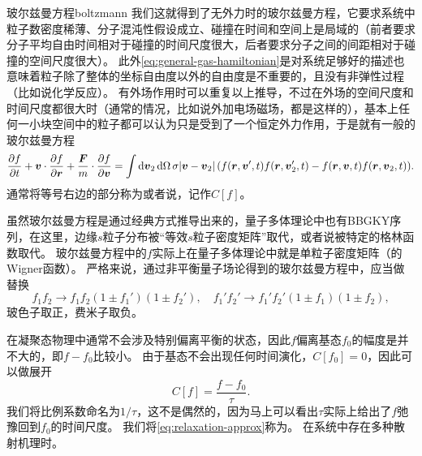 \begin{back}{玻尔兹曼方程}{boltzmann}
    我们这就得到了无外力时的玻尔兹曼方程，它要求系统中粒子数密度稀薄、分子混沌性假设成立、碰撞在时间和空间上是局域的（前者要求分子平均自由时间相对于碰撞的时间尺度很大，后者要求分子之间的间距相对于碰撞的空间尺度很大）。
    此外\eqref{eq:general-gas-hamiltonian}是对系统足够好的描述也意味着粒子除了整体的坐标自由度以外的自由度是不重要的，且没有非弹性过程（比如说化学反应）。
    有外场作用时可以重复以上推导，不过在外场的空间尺度和时间尺度都很大时（通常的情况，比如说外加电场磁场，都是这样的），基本上任何一小块空间中的粒子都可以认为只是受到了一个恒定外力作用，于是就有一般的玻尔兹曼方程
    \begin{equation}
        \pdv{f}{t} + \vb*{v} \cdot \pdv{f}{\vb*{r}} + \frac{\vb*{F}}{m} \cdot \pdv{f}{\vb*{v}} = \int \dd{\vb*{v}_2} \dd{\Omega} \sigma \abs*{\vb*{v}-\vb*{v}_2} (f(\vb*{r}, \vb*{v}', t) f(\vb*{r}, \vb*{v}'_{2}, t) - f(\vb*{r}, \vb*{v}, t) f(\vb*{r}, \vb*{v}_{2}, t)).
        \label{eq:boltzmann-eq-with-force}
    \end{equation}
    通常将等号右边的部分称为或者说，记作$C[f]$。

    虽然玻尔兹曼方程是通过经典方式推导出来的，量子多体理论中也有BBGKY序列，在这里，边缘$s$粒子分布被“等效$s$粒子密度矩阵”取代，或者说被特定的格林函数取代。
    玻尔兹曼方程中的$f$实际上在量子多体理论中就是单粒子密度矩阵（的Wigner函数）。
    严格来说，通过非平衡量子场论得到的玻尔兹曼方程中，应当做替换
    \begin{equation}
        f_1 f_2 \longrightarrow f_1 f_2 (1 \pm f_1') (1 \pm f_2'), \quad f_1' f_2' \longrightarrow f_1' f_2' (1 \pm f_1) (1 \pm f_2),
    \end{equation}
    玻色子取正，费米子取负。

    在凝聚态物理中通常不会涉及特别偏离平衡的状态，因此$f$偏离基态$f_0$的幅度是并不大的，即$f - f_0$比较小。
    由于基态不会出现任何时间演化，$C[f_0] = 0$，因此可以做展开
    \begin{equation}
        C[f] = \frac{f - f_0}{\tau}.
        \label{eq:relaxation-approx}
    \end{equation}
    我们将比例系数命名为$1 / \tau$，这不是偶然的，因为马上可以看出$\tau$实际上给出了$f$弛豫回到$f_0$的时间尺度。
    我们将\eqref{eq:relaxation-approx}称为。
    在系统中存在多种散射机理时。%
\end{back}